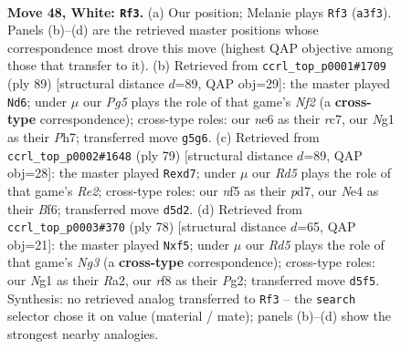 \documentclass[11pt]{article}
\begin{document}
\clearpage

\begin{figure}[p]\centering
\begin{subfigure}{0.46\textwidth}\centering
\resizebox{\linewidth}{!}{%
\newchessgame
\chessboard[
  setfen={4kr2/6br/4n3/3R1nPp/P3N3/R7/5KP1/6N1 w - - 5 48},
  showmover=false,
  pgfstyle=straightmove, color=movearrow, markmove={a3-f3}
]}
\caption{}
\end{subfigure}\hfill
\begin{subfigure}{0.46\textwidth}\centering
\resizebox{\linewidth}{!}{%
\newchessgame
\chessboard[
  setfen={1r6/2R2n1p/p7/3Pp1k1/4Pp2/P2N1r2/8/2KR4 b - - 7 45},
  showmover=false,
  pgfstyle=straightmove, color=movearrow, markmove={f7-d6}
]}
\caption{}
\end{subfigure}
\\[4pt]
\begin{subfigure}{0.46\textwidth}\centering
\resizebox{\linewidth}{!}{%
\newchessgame
\chessboard[
  setfen={3r2k1/3Pr2p/5b2/4pp2/4n3/4NN2/1P5P/4RR1K b - - 1 40},
  showmover=false,
  pgfstyle=straightmove, color=movearrow, markmove={e7-d7}
]}
\caption{}
\end{subfigure}\hfill
\begin{subfigure}{0.46\textwidth}\centering
\resizebox{\linewidth}{!}{%
\newchessgame
\chessboard[
  setfen={6k1/1r2br2/4p2p/p4n2/B4P2/6N1/R5PK/5R2 w - - 0 40},
  showmover=false,
  pgfstyle=straightmove, color=movearrow, markmove={g3-f5}
]}
\caption{}
\end{subfigure}
\caption{\textbf{Move 48, White: \texttt{Rf3}.} (a) Our position; Melanie plays \texttt{Rf3} (\texttt{a3f3}). Panels (b)--(d) are the retrieved master positions whose correspondence most drove this move (highest QAP objective among those that transfer to it). (b) Retrieved from \texttt{ccrl\_top\_p0001\#1709} (ply 89) [structural distance $d$=89, QAP obj=29]: the master played \texttt{Nd6}; under $\mu$ our \emph{Pg5} plays the role of that game's \emph{Nf2} (a \textbf{cross-type} correspondence); cross-type roles: our \emph{n}e6 as their \emph{r}c7, our \emph{N}g1 as their \emph{P}h7; transferred move \texttt{g5g6}. (c) Retrieved from \texttt{ccrl\_top\_p0002\#1648} (ply 79) [structural distance $d$=89, QAP obj=28]: the master played \texttt{Rexd7}; under $\mu$ our \emph{Rd5} plays the role of that game's \emph{Re2}; cross-type roles: our \emph{n}f5 as their \emph{p}d7, our \emph{N}e4 as their \emph{B}f6; transferred move \texttt{d5d2}. (d) Retrieved from \texttt{ccrl\_top\_p0003\#370} (ply 78) [structural distance $d$=65, QAP obj=21]: the master played \texttt{Nxf5}; under $\mu$ our \emph{Rd5} plays the role of that game's \emph{Ng3} (a \textbf{cross-type} correspondence); cross-type roles: our \emph{N}g1 as their \emph{R}a2, our \emph{r}f8 as their \emph{P}g2; transferred move \texttt{d5f5}. Synthesis: no retrieved analog transferred to \texttt{Rf3} -- the \texttt{search} selector chose it on value (material / mate); panels (b)--(d) show the strongest nearby analogies.}
\label{fig:thought-m94}
\end{figure}
\end{document}
